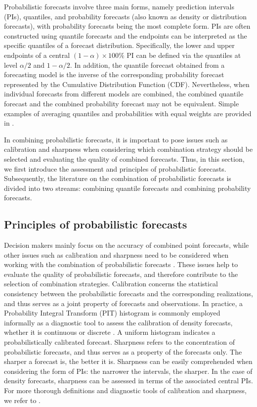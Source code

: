 \documentclass[11pt]{article}
\begin{document}
Probabilistic forecasts involve three main forms, namely prediction intervals (PIs), quantiles, and probability forecasts (also known as density or distribution forecasts), with probability forecasts being the most complete form. PIs are often constructed using quantile forecasts and the endpoints can be interpreted as the specific quantiles of a forecast distribution. Specifically, the lower and upper endpoints of a central $(1-\alpha)\times 100\%$ PI can be defined via the quantiles at level $\alpha/2$ and $1-\alpha/2$. In addition, the quantile forecast obtained from a forecasting model is the inverse of the corresponding probability forecast represented by the Cumulative Distribution Function (CDF). Nevertheless, when individual forecasts from different models are combined, the combined quantile forecast and the combined probability forecast may not be equivalent. Simple examples of averaging quantiles and probabilities with equal weights are provided in \cite{Lichtendahl2013-rt}.

In combining probabilistic forecasts, it is important to pose issues such as calibration and sharpness when considering which combination strategy should be selected and evaluating the quality of combined forecasts. Thus, in this section, we first introduce the assessment and principles of probabilistic forecasts. Subsequently, the literature on the combination of probabilistic forecasts is divided into two streams: combining quantile forecasts and combining probability forecasts.

\subsection{Principles of probabilistic forecasts}
\label{sec:principles_of_probabilistic_forecasts}

Decision makers mainly focus on the accuracy of combined point forecasts, while other issues such as calibration and sharpness need to be considered when working with the combination of probabilistic forecasts \citep{Gneiting2007-fr,Gneiting2007-ij,Lahiri2015-qq}. These issues help to evaluate the quality of probabilistic forecasts, and therefore contribute to the selection of combination strategies. Calibration concerns the statistical consistency between the probabilistic forecasts and the corresponding realizations, and thus serves as a joint property of forecasts and observations. In practice, a Probability Integral Transform (PIT) histogram is commonly employed informally as a diagnostic tool to assess the calibration of density forecasts, whether it is continuous \citep{Dawid1984-vp,Diebold1997-cr} or discrete \citep{Gneiting2013-hl}. A uniform histogram indicates a probabilistically calibrated forecast. Sharpness refers to the concentration of probabilistic forecasts, and thus serves as a property of the forecasts only. The sharper a forecast is, the better it is. Sharpness can be easily comprehended when considering the form of PIs: the narrower the intervals, the sharper. In the case of density forecasts, sharpness can be assessed in terms of the associated central PIs. For more thorough definitions and diagnostic tools of calibration and sharpness, we refer to \cite{Gneiting2014-tz}.
\end{document}
